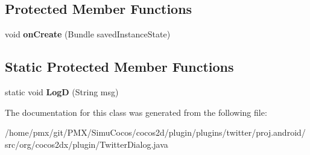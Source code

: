 \subsection*{Protected Member Functions}
\begin{DoxyCompactItemize}
\item 
\mbox{\label{classorg_1_1cocos2dx_1_1plugin_1_1TwitterDialog_a5b35ff428b1ad2e7f9051de45e5eb76f}} 
void {\bfseries on\+Create} (Bundle saved\+Instance\+State)
\end{DoxyCompactItemize}
\subsection*{Static Protected Member Functions}
\begin{DoxyCompactItemize}
\item 
\mbox{\label{classorg_1_1cocos2dx_1_1plugin_1_1TwitterDialog_ade78563482e702e1c15c09826c2c147c}} 
static void {\bfseries LogD} (String msg)
\end{DoxyCompactItemize}


The documentation for this class was generated from the following file\+:\begin{DoxyCompactItemize}
\item 
/home/pmx/git/\+P\+M\+X/\+Simu\+Cocos/cocos2d/plugin/plugins/twitter/proj.\+android/src/org/cocos2dx/plugin/Twitter\+Dialog.\+java\end{DoxyCompactItemize}
